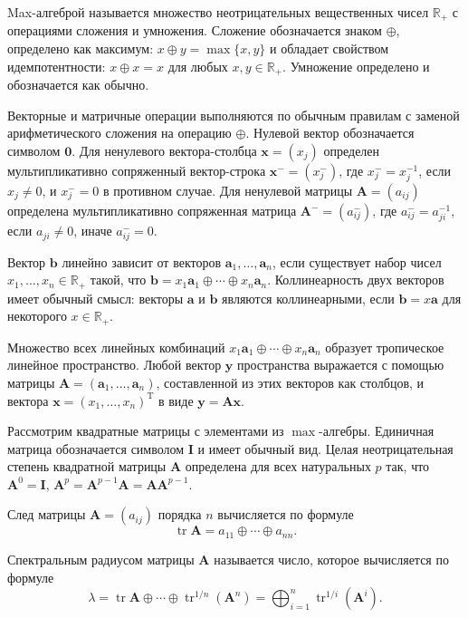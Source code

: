 \documentclass[specialist,
substylefile = spbu.rtx,
               subf,href,colorlinks=true, 12pt]{disser}
\begin{document}
    Max-алгеброй называется множество неотрицательных вещественных чисел $\mathbb{R}_{+}$ с операциями сложения и умножения. Сложение обозначается знаком $\oplus$, определено как максимум: ${x\oplus y=\max\{x,y\}}$ и обладает свойством идемпотентности: ${x\oplus x=x}$ для любых $x,y\in\mathbb{R}_{+}$. Умножение определено и обозначается как обычно.  
            
    Векторные и матричные операции выполняются по обычным правилам с заменой арифметического сложения на операцию $\oplus$. Нулевой вектор обозначается символом $\bm{0}$. Для ненулевого вектора-столбца $\bm{x}=(x_{j})$ определен мультипликативно сопряженный вектор-строка $\bm{x}^{-}=(x_{j}^{-})$, где $x_{j}^{-}=x_{j}^{-1}$, если $x_{j}\ne0$, и $x_{j}^{-}=0$ в противном случае. Для ненулевой матрицы $\bm{A}=(a_{ij})$ определена мультипликативно сопряженная матрица $\bm{A}^{-}=(a_{ij}^{-})$, где $a_{ij}^{-}=a_{ji}^{-1}$, если $a_{ji}\ne0$, иначе $a_{ij}^{-}=0$.

    Вектор $\bm{b}$ линейно зависит от векторов $\bm{a}_{1},\ldots,\bm{a}_{n}$, если существует набор чисел $x_{1},\ldots,x_{n}\in\mathbb{R}_{+}$ такой, что $\bm{b}=x_{1}\bm{a}_{1}\oplus\cdots\oplus x_{n}\bm{a}_{n}$. Коллинеарность двух векторов имеет обычный смысл: векторы $\bm{a}$ и $\bm{b}$ являются коллинеарными, если $\bm{b}=x\bm{a}$ для некоторого $x\in\mathbb{R}_{+}$.

    Множество всех линейных комбинаций $x_{1}\bm{a}_{1}\oplus\cdots\oplus x_{n}\bm{a}_{n}$ образует тропическое линейное пространство. Любой вектор $\bm{y}$ пространства выражается с помощью матрицы $\bm{A}=(\bm{a}_{1},\ldots,\bm{a}_{n})$, составленной из этих векторов как столбцов, и вектора $\bm{x}=(x_{1},\ldots,x_{n})^{\mathrm{T}}$ в виде $\bm{y}=\bm{A}\bm{x}$.

    Рассмотрим квадратные матрицы с элементами из $\max$-алгебры. Единичная матрица обозначается символом $\bm{I}$ и имеет обычный вид. Целая неотрицательная степень квадратной матрицы $\bm{A}$ определена для всех натуральных $p$ так, что $\bm{A}^{0}=\bm{I}$, $\bm{A}^{p}=\bm{A}^{p-1}\bm{A}=\bm{A}\bm{A}^{p-1}$.

    След матрицы $\bm{A}=(a_{ij})$ порядка $n$ вычисляется по формуле 
    $$\mathop\mathrm{tr}\bm{A}=a_{11}\oplus\cdots\oplus a_{nn}.$$

    Спектральным радиусом матрицы $\bm{A}$ называется число, которое вычисляется по формуле
    \begin{equation*}
    \lambda
    =
    \mathop\mathrm{tr}\bm{A}\oplus\cdots\oplus\mathop\mathrm{tr}\nolimits^{1/n}(\bm{A}^{n})
    =
    \bigoplus_{i=1}^{n}{\mathop\mathrm{tr}}^{1/i}(\bm{A}^{i}).
    \end{equation*}
\end{document}
